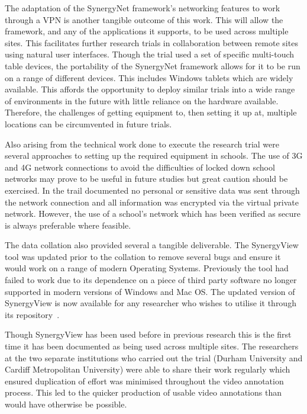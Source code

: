 \documentclass[a4paper,11pt]{article}
\begin{document}
The adaptation of the SynergyNet framework's networking features to work through a VPN is another tangible outcome of this work.
This will allow the framework, and any of the applications it supports, to be used across multiple sites.
This facilitates further research trials in collaboration between remote sites using natural user interfaces.
Though the trial used a set of specific multi-touch table devices, the portability of the SynergyNet framework allows for it to be run on a range of different devices.
This includes Windows tablets which are widely available.
This affords the opportunity to deploy similar trials into a wide range of environments in the future with little reliance on the hardware available.
Therefore, the challenges of getting equipment to, then setting it up at, multiple locations can be circumvented in future trials.

Also arising from the technical work done to execute the research trial were several approaches to setting up the required equipment in schools.
The use of 3G and 4G network connections to avoid the difficulties of locked down school networks may prove to be useful in future studies but great caution should be exercised.
In the trail documented no personal or sensitive data was sent through the network connection and all information was encrypted via the virtual private network.
However, the use of a school's network which has been verified as secure is always preferable where feasible.

The data collation also provided several a tangible deliverable.
The SynergyView tool was updated prior to the collation to remove several bugs and ensure it would work on a range of modern Operating Systems.
Previously the tool had failed to work due to its dependence on a piece of third party software no longer supported in modern versions of Windows and Mac OS.
The updated version of SynergyView is now available for any researcher who wishes to utilise it through its repository~\cite{kyaw:2010}.

Though SynergyView has been used before in previous research this is the first time it has been documented as being used across multiple sites.
The researchers at the two separate institutions who carried out the trial (Durham University and Cardiff Metropolitan University) were able to share their work regularly which ensured duplication of effort was minimised throughout the video annotation process.
This led to the quicker production of usable video annotations than would have otherwise be possible.
\end{document}
